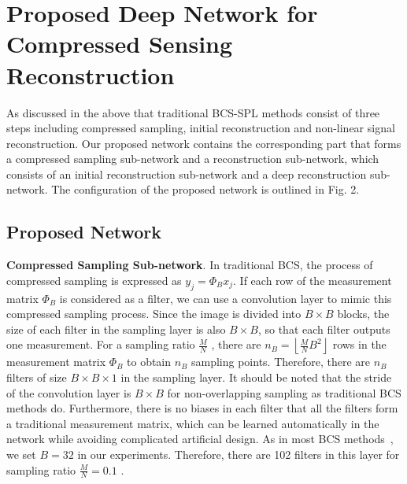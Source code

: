 \documentclass[5pt]{article}
\begin{document}
\section{Proposed Deep Network for Compressed Sensing Reconstruction}

As discussed in the above that traditional BCS-SPL methods consist of three steps including compressed sampling, initial reconstruction and non-linear signal reconstruction. Our proposed network contains the corresponding part that forms a compressed sampling sub-network and a reconstruction sub-network, which consists of an initial reconstruction sub-network and a deep reconstruction sub-network. The configuration of the proposed network is outlined in Fig. 2.

\subsection{Proposed Network}
\textbf{Compressed Sampling Sub-network}. In traditional BCS, the process of compressed sampling is expressed as ${y_j} = {\Phi _B}{x_j}$. If each row of the measurement matrix ${\Phi _B}$ is considered as a filter, we can use a convolution layer to mimic this compressed sampling process. Since the image is divided into $B \times B$ blocks, the size of each filter in the sampling layer is also $B \times B$, so that each filter outputs one measurement. For a sampling ratio $\frac{M}{N}$ , there are ${n_B} = \left\lfloor {\frac{M}{N}{B^2}} \right\rfloor $  rows in the measurement matrix ${\Phi _B}$  to obtain ${n_B}$ sampling points. Therefore, there are ${n_B}$ filters of size $B \times B \times 1$ in the sampling layer. It should be noted that the stride of the convolution layer is $B \times B$ for non-overlapping sampling as traditional BCS methods do. Furthermore, there is no biases in each filter that all the filters form a traditional measurement matrix, which can be learned automatically in the network while avoiding complicated artificial design. As in most BCS methods~\cite{rf1,rf18,rf19,rf20}, we set $B = 32$  in our experiments. Therefore, there are 102 filters in this layer for sampling ratio $\frac{M}{N} = 0.1$ .
\end{document}
